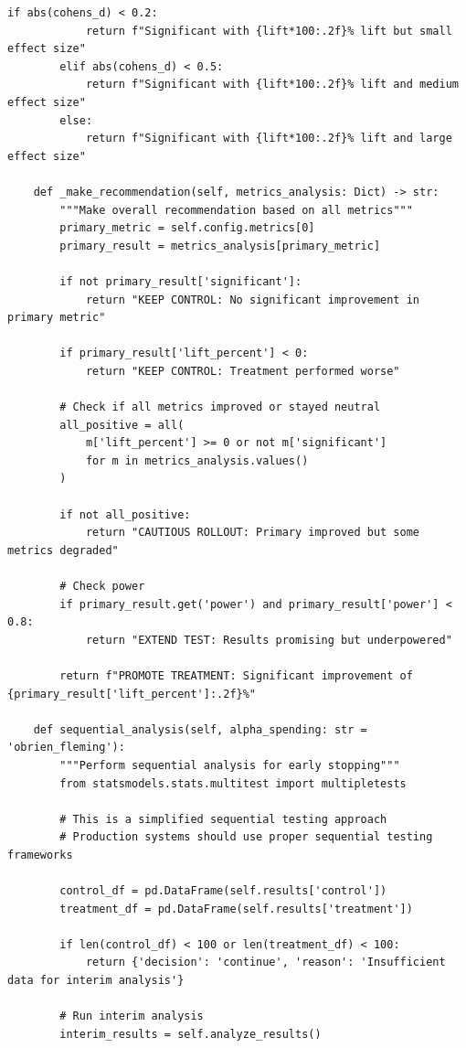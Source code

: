 \begin{lstlisting}[style=python, caption=Production A/B testing framework for ML models]
        if abs(cohens_d) < 0.2:
            return f"Significant with {lift*100:.2f}% lift but small effect size"
        elif abs(cohens_d) < 0.5:
            return f"Significant with {lift*100:.2f}% lift and medium effect size"
        else:
            return f"Significant with {lift*100:.2f}% lift and large effect size"

    def _make_recommendation(self, metrics_analysis: Dict) -> str:
        """Make overall recommendation based on all metrics"""
        primary_metric = self.config.metrics[0]
        primary_result = metrics_analysis[primary_metric]

        if not primary_result['significant']:
            return "KEEP CONTROL: No significant improvement in primary metric"

        if primary_result['lift_percent'] < 0:
            return "KEEP CONTROL: Treatment performed worse"

        # Check if all metrics improved or stayed neutral
        all_positive = all(
            m['lift_percent'] >= 0 or not m['significant']
            for m in metrics_analysis.values()
        )

        if not all_positive:
            return "CAUTIOUS ROLLOUT: Primary improved but some metrics degraded"

        # Check power
        if primary_result.get('power') and primary_result['power'] < 0.8:
            return "EXTEND TEST: Results promising but underpowered"

        return f"PROMOTE TREATMENT: Significant improvement of {primary_result['lift_percent']:.2f}%"

    def sequential_analysis(self, alpha_spending: str = 'obrien_fleming'):
        """Perform sequential analysis for early stopping"""
        from statsmodels.stats.multitest import multipletests

        # This is a simplified sequential testing approach
        # Production systems should use proper sequential testing frameworks

        control_df = pd.DataFrame(self.results['control'])
        treatment_df = pd.DataFrame(self.results['treatment'])

        if len(control_df) < 100 or len(treatment_df) < 100:
            return {'decision': 'continue', 'reason': 'Insufficient data for interim analysis'}

        # Run interim analysis
        interim_results = self.analyze_results()


\end{lstlisting}
